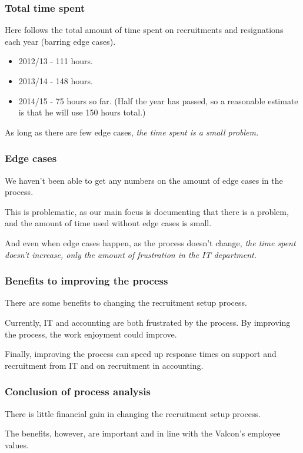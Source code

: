 \subsubsection{Total time spent}
Here follows the total amount of time spent on recruitments and resignations each year (barring edge cases).
\begin{itemize}
\item 2012/13 - 111 hours.
\item 2013/14 - 148 hours.
\item 2014/15 - 75 hours so far. (Half the year has passed, so a reasonable estimate is that he will use 150 hours total.)
\end{itemize}

As long as there are few edge cases, \emph{the time spent is a small problem.}

\subsubsection{Edge cases}
We haven't been able to get any numbers on the amount of edge cases in the process.

This is problematic, as our main focus is documenting that there is a problem, and the amount of time used without edge cases is small.

And even when edge cases happen, as the process doesn't change, \emph{the time spent doesn't increase, only the amount of frustration in the IT department.}

\subsubsection{Benefits to improving the process}
There are some benefits to changing the recruitment setup process.

Currently, IT and accounting are both frustrated by the process.
By improving the process, the work enjoyment could improve.

Finally, improving the process can speed up response times on support and recruitment from IT and on recruitment in accounting.

\subsubsection{Conclusion of process analysis}
There is little financial gain in changing the recruitment setup process.

The benefits, however, are important and in line with the Valcon's employee values.

